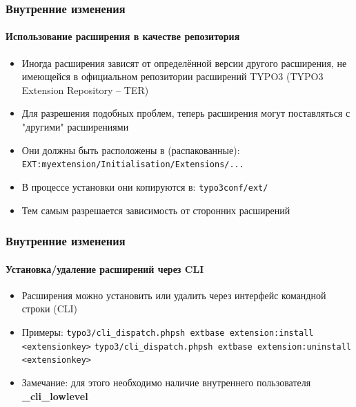 
\begin{frame}[fragile]
	\frametitle{Внутренние изменения}
	\framesubtitle{Использование расширения в качестве репозитория}

	\begin{itemize}
		\item Иногда расширения зависят от определённой версии другого расширения, не имеющейся в официальном репозитории
		расширений TYPO3 (TYPO3 Extension Repository – TER)
		\item Для разрешения подобных проблем, теперь расширения могут поставляться с "другими" расширениями
		\item Они должны быть расположены в (распакованные):\newline
			\texttt{EXT:myextension/Initialisation/Extensions/...}

		\item В процессе установки они копируются в:\newline
			\texttt{typo3conf/ext/}

		\item Тем самым разрешается зависимость от сторонних расширений

	\end{itemize}

\end{frame}


\begin{frame}[fragile]
	\frametitle{Внутренние изменения}
	\framesubtitle{Установка/удаление расширений через CLI}

	\begin{itemize}
		\item Расширения можно установить или удалить через интерфейс командной строки (CLI)
		\item Примеры:
			\lstinline!typo3/cli_dispatch.phpsh extbase extension:install <extensionkey>!
			\lstinline!typo3/cli_dispatch.phpsh extbase extension:uninstall <extensionkey>!

		\item Замечание: для этого необходимо наличие внутреннего пользователя \textbf{\_cli\_lowlevel}
	\end{itemize}

\end{frame}


